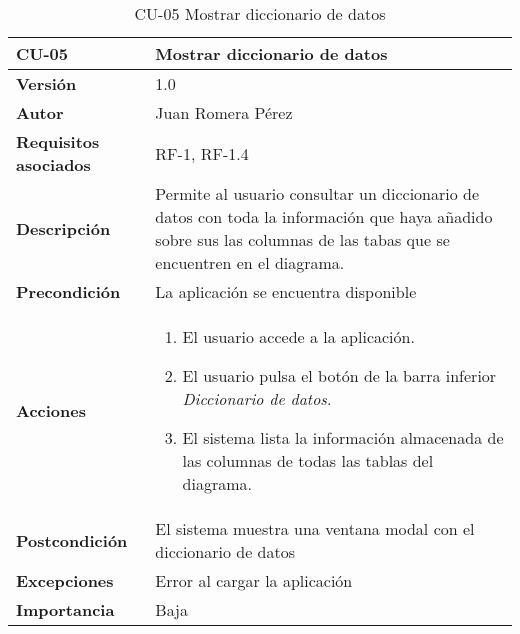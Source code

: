 \begin{table}[p]
    \centering
    \begin{tabularx}{\linewidth}{ p{} p{}}
		\toprule
		\textbf{CU-05}    & \textbf{Mostrar diccionario de datos}\\
		\toprule
		\textbf{Versión}              & 1.0    \\
		\textbf{Autor}                & Juan Romera Pérez \\
		\textbf{Requisitos asociados} & RF-1, RF-1.4 \\
		\textbf{Descripción}          & Permite al usuario consultar un diccionario de datos con toda la información que haya añadido sobre sus las columnas de las tabas que se encuentren en el diagrama. \\
		\textbf{Precondición}         & La aplicación se encuentra disponible \\
		\textbf{Acciones}             &
		\begin{enumerate}
			\def\labelenumi{\arabic{enumi}.}
			\tightlist
			\item El usuario accede a la aplicación.
            \item El usuario pulsa el botón de la barra inferior \emph{Diccionario de datos}.
            \item El sistema lista la información almacenada de las columnas de todas las tablas del diagrama.
		\end{enumerate}\\
		\textbf{Postcondición}        & El sistema muestra una ventana modal con el diccionario de datos \\
		\textbf{Excepciones}          & Error al cargar la aplicación \\
		\textbf{Importancia}          & Baja \\
		\bottomrule
    \end{tabularx}
    \caption{CU-05 Mostrar diccionario de datos}
\end{table}

